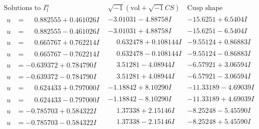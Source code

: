 \documentclass[1p]{elsarticle_modified}
\theoremstyle{definition}
\newcommand{\I}{\sqrt{-1}}
\begin{document}
$$\begin{array}{c|c|c}  
\text{Solutions to }I^u_{1}& \I (\text{vol} + \sqrt{-1}CS) & \text{Cusp shape}\\
 \hline 
\begin{aligned}
u &= \phantom{-}0.882555 + 0.461026 I\end{aligned}
 & -3.01031 - 4.88758 I & -15.6251 + 6.5404 I \\ \hline\begin{aligned}
u &= \phantom{-}0.882555 - 0.461026 I\end{aligned}
 & -3.01031 + 4.88758 I & -15.6251 - 6.5404 I \\ \hline\begin{aligned}
u &= \phantom{-}0.665767 + 0.762214 I\end{aligned}
 & \phantom{-}0.632478 + 0.108144 I & -9.55124 + 0.86883 I \\ \hline\begin{aligned}
u &= \phantom{-}0.665767 - 0.762214 I\end{aligned}
 & \phantom{-}0.632478 - 0.108144 I & -9.55124 - 0.86883 I \\ \hline\begin{aligned}
u &= -0.639372 + 0.784790 I\end{aligned}
 & \phantom{-}3.51281 - 4.08944 I & -6.57921 + 3.06594 I \\ \hline\begin{aligned}
u &= -0.639372 - 0.784790 I\end{aligned}
 & \phantom{-}3.51281 + 4.08944 I & -6.57921 - 3.06594 I \\ \hline\begin{aligned}
u &= \phantom{-}0.624433 + 0.797000 I\end{aligned}
 & -1.18842 + 8.10290 I & -11.33189 - 4.69039 I \\ \hline\begin{aligned}
u &= \phantom{-}0.624433 - 0.797000 I\end{aligned}
 & -1.18842 - 8.10290 I & -11.33189 + 4.69039 I \\ \hline\begin{aligned}
u &= -0.785703 + 0.584322 I\end{aligned}
 & \phantom{-}1.37338 + 2.15146 I & -8.25248 - 5.45590 I \\ \hline\begin{aligned}
u &= -0.785703 - 0.584322 I\end{aligned}
 & \phantom{-}1.37338 - 2.15146 I & -8.25248 + 5.45590 I \\ \hline\begin{aligned}

\end{aligned}
\end{array}$$
\end{document}
